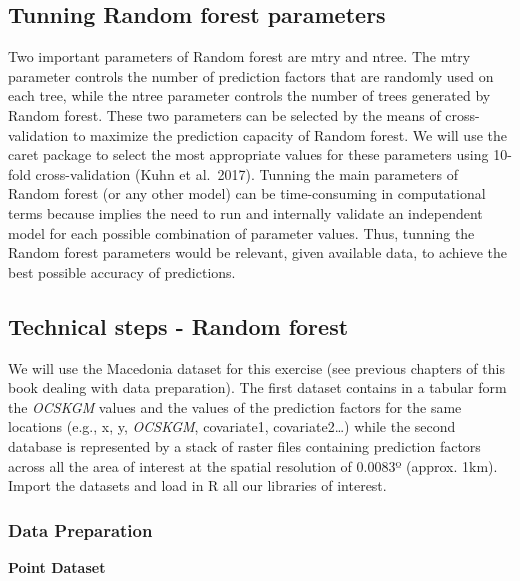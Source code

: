 \documentclass[10pt,b5paper,]{book}
\theoremstyle{definition}
\theoremstyle{definition}
\theoremstyle{definition}
\theoremstyle{remark}
\begin{document}
\hypertarget{tunning-random-forest-parameters}{%
\subsection{Tunning Random forest
parameters}\label{tunning-random-forest-parameters}}

Two important parameters of Random forest are mtry and ntree. The mtry
parameter controls the number of prediction factors that are randomly
used on each tree, while the ntree parameter controls the number of
trees generated by Random forest. These two parameters can be selected
by the means of cross-validation to maximize the prediction capacity of
Random forest. We will use the caret package to select the most
appropriate values for these parameters using 10-fold cross-validation
(Kuhn et al.~2017). Tunning the main parameters of Random forest (or any
other model) can be time-consuming in computational terms because
implies the need to run and internally validate an independent model for
each possible combination of parameter values. Thus, tunning the Random
forest parameters would be relevant, given available data, to achieve
the best possible accuracy of predictions.

\hypertarget{technical-steps---random-forest}{%
\subsection{Technical steps - Random
forest}\label{technical-steps---random-forest}}

We will use the Macedonia dataset for this exercise (see previous
chapters of this book dealing with data preparation). The first dataset
contains in a tabular form the \emph{OCSKGM} values and the values of
the prediction factors for the same locations (e.g., x, y,
\emph{OCSKGM}, covariate1, covariate2\ldots{}) while the second database
is represented by a stack of raster files containing prediction factors
across all the area of interest at the spatial resolution of 0.0083º
(approx. 1km). Import the datasets and load in R all our libraries of
interest.

\hypertarget{data-preparation-2}{%
\subsubsection{Data Preparation}\label{data-preparation-2}}

\textbf{Point Dataset}
\end{document}
